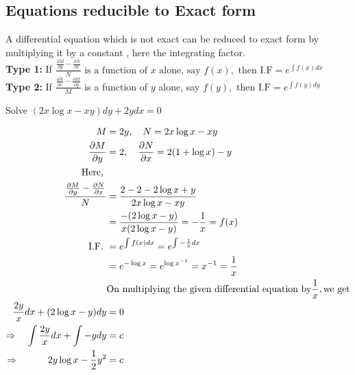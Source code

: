 \subsection{Equations reducible to Exact form}
A differential equation which is not exact can be reduced to exact form  by multiplying it by a constant , here the integrating factor.\\
\textbf{Type 1:} If $ \frac{\frac{\partial M}{\partial y}-\frac{\partial N}{\partial x}}{N}\text { is a function of } x \text { alone, say } f(x), \text { then } \mathrm{I.F}=e^{\int f(x) d x}$\\
\textbf{Type 2:} If $\frac{\frac{\partial N}{\partial x}-\frac{\partial M}{\partial y}}{M}$ is a function of $y$ alone, say $f(y),$ then
$
\mathrm{I.F} =e^{\int f(y) d y}
$
\begin{exercise}
	Solve $(2 x \log x-x y) d y+2 y d x=0$
\end{exercise}
\begin{answer}
\begin{align*}
M &=2 y,\quad N=2 x \log x-x y\notag\\
\frac{\partial M}{\partial y}&=2,\quad\frac{\partial N}{\partial x}=2(1+\log x)-y\\
\text { Here, }\notag \\
\quad \frac{\frac{\partial M}{\partial y}-\frac{\partial N}{\partial x}}{N}&=\frac{2-2-2 \log x+y}{2 x \log x-x y}\\&=\frac{-(2 \log x-y)}{x(2 \log x-y)}=-\frac{1}{x}=f(x)\notag\\\text { I.F. }&=e^{\int f(x) d x}=e^{\int-\frac{1}{x} d x}\\&=e^{-\log x}=e^{\log x^{-1}}=x^{-1}=\frac{1}{x}\\
&\text{On multiplying the given differential equation by}  \frac{1}{x}, \text{we get}\\
\frac{2 y}{x} d x+(2 \log x-y) d y&=0 \\ \Rightarrow \quad \int \frac{2 y}{x} d x+\int-y d y&=c \\
\Rightarrow  \qquad\quad 2 y \log x-\frac{1}{2} y^{2}&=c
\end{align*}
\end{answer}
